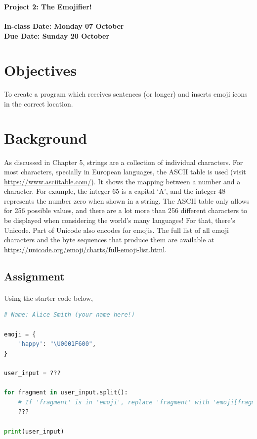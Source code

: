 \documentclass[letter,10pt]{article}
\begin{document}
    
    \huge
    \textbf{Project 2: The Emojifier!}
    \normalsize
    \\ ~~ \\
    \textbf{In-class Date: Monday 07 October} \\
    \textbf{Due Date: Sunday 20 October}
    
    \section*{Objectives}
    \paragraph{}To create a program which receives sentences (or longer) and inserts emoji icons in the correct location.
    
    \section*{Background}
    \paragraph{}As discussed in Chapter 5, strings are a collection of individual characters. For most characters, specially in European languages, the ASCII table is used (visit \url{https://www.asciitable.com/}). It shows the mapping between a number and a character. For example, the integer 65 is a capital `A', and the integer 48 represents the number zero when shown in a string. The ASCII table only allows for 256 possible values, and there are a lot more than 256 different characters to be displayed when considering the world's many languages! For that, there's Unicode. Part of Unicode also encodes for emojis. The full list of all emoji characters and the byte sequences that produce them are available at \url{https://unicode.org/emoji/charts/full-emoji-list.html}.
    
    \subsection*{Assignment}
    \paragraph{}Using the starter code below, 
    
    \begin{lstlisting}[language=python]
# Name: Alice Smith (your name here!)

emoji = {
    'happy': "\U0001F600",
}

user_input = ???

for fragment in user_input.split():
    # If 'fragment' is in 'emoji', replace 'fragment' with 'emoji[fragment]'
    ???

print(user_input)
    \end{lstlisting}
\end{document}
